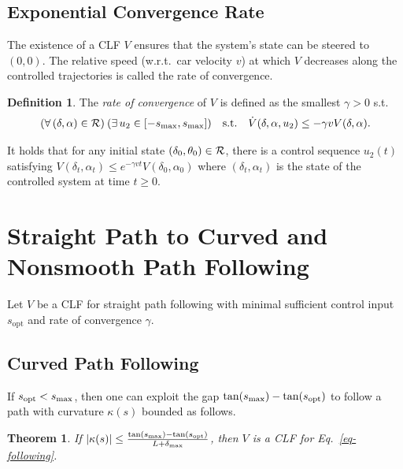 \documentclass{article}
\theoremstyle{plain}
\newtheorem{theorem}{Theorem}
\theoremstyle{definition}
\newtheorem{definition}{Definition}
\theoremstyle{remark}
\newcommand{\smax}{s_\maxtxt}
\newcommand{\sopt}{s_{\mathrm{opt}}}
\newcommand{\deltamax}{\delta_\maxtxt}
\begin{document}
\subsection{Exponential Convergence Rate}

The existence of a CLF $V$ ensures that the system's state can be steered to $(0,0)$.
The relative speed (w.r.t.~car velocity $v$) at which $V$ decreases along the controlled trajectories is called the rate of convergence.

\begin{definition}\label{def-convergence-rate}
The \emph{rate of convergence} of $V$ is defined as the smallest $\gamma>0$ s.t.
\begin{equation}\label{eq-lie-clf-rate}
(\forall\,(\delta,\alpha)\in\calR)\:(\exists\,u_2\in[-\smax,\smax])
\quad\text{s.t.}\quad \dot{V}(\delta,\alpha,u_2) \leq -\gamma vV(\delta,\alpha).
\end{equation}
\end{definition}

It holds that for any initial state $(\delta_0,\theta_0)\in\mathcal{R}$,
there is a control sequence $u_2(t)$ satisfying
$V(\delta_t,\alpha_t)\leq e^{-\gamma vt}V(\delta_0,\alpha_0)$
where $(\delta_t,\alpha_t)$ is the state of the controlled system at time $t\geq0$.

\section{Straight Path to Curved and Nonsmooth Path Following}\label{sec-curved}

Let $V$ be a CLF for straight path following
with minimal sufficient control input $\sopt$ and rate of convergence $\gamma$.

\subsection{Curved Path Following}

If $\sopt<\smax$, then one can exploit the gap $\tan(\smax)-\tan(\sopt)$
to follow a path with curvature $\kappa(s)$ bounded as follows.

\begin{theorem}\label{thm-straight-curved}
If $\lvert\kappa(s)\rvert\leq \frac{\tan(\smax)-\tan(\sopt)}{L+\deltamax}$, then $V$ is a CLF for Eq.~\ref{eq-following}.
\end{theorem}
\end{document}
